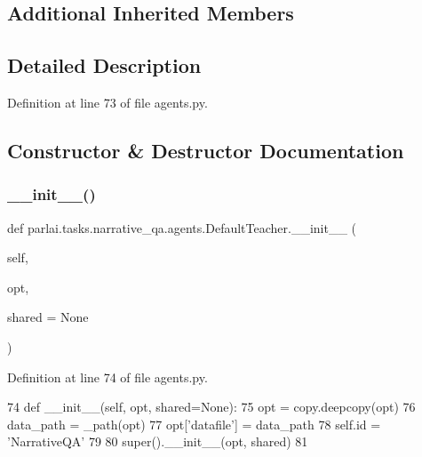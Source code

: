 \subsection*{Additional Inherited Members}


\subsection{Detailed Description}


Definition at line 73 of file agents.\+py.



\subsection{Constructor \& Destructor Documentation}
\mbox{\label{classparlai_1_1tasks_1_1narrative__qa_1_1agents_1_1DefaultTeacher_a1e28f1ca5d28d95fe534c91900889fec}} 
\subsubsection{\texorpdfstring{\+\_\+\+\_\+init\+\_\+\+\_\+()}{\_\_init\_\_()}}
{\footnotesize\ttfamily def parlai.\+tasks.\+narrative\+\_\+qa.\+agents.\+Default\+Teacher.\+\_\+\+\_\+init\+\_\+\+\_\+ (\begin{DoxyParamCaption}\item[{}]{self,  }\item[{}]{opt,  }\item[{}]{shared = {\ttfamily None} }\end{DoxyParamCaption})}



Definition at line 74 of file agents.\+py.


\begin{DoxyCode}
74     \textcolor{keyword}{def }\_\_init\_\_(self, opt, shared=None):
75         opt = copy.deepcopy(opt)
76         data\_path = \_path(opt)
77         opt[\textcolor{stringliteral}{'datafile'}] = data\_path
78         self.id = \textcolor{stringliteral}{'NarrativeQA'}
79 
80         super().\_\_init\_\_(opt, shared)
81 
\end{DoxyCode}


